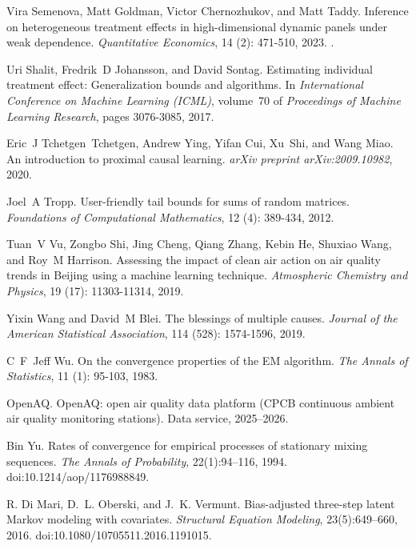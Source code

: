 Vira Semenova, Matt Goldman, Victor Chernozhukov, and Matt Taddy.
\newblock Inference on heterogeneous treatment effects in high-dimensional dynamic panels under weak dependence.
\newblock \emph{Quantitative Economics}, 14 (2): 471-510, 2023.
\newblock {}.

Uri Shalit, Fredrik~D Johansson, and David Sontag.
\newblock Estimating individual treatment effect: Generalization bounds and algorithms.
\newblock In \emph{International Conference on Machine Learning (ICML)}, volume~70 of \emph{Proceedings of Machine Learning Research}, pages 3076-3085, 2017.

Eric~J Tchetgen~Tchetgen, Andrew Ying, Yifan Cui, Xu~Shi, and Wang Miao.
\newblock An introduction to proximal causal learning.
\newblock \emph{arXiv preprint arXiv:2009.10982}, 2020.

Joel~A Tropp.
\newblock User-friendly tail bounds for sums of random matrices.
\newblock \emph{Foundations of Computational Mathematics}, 12 (4): 389-434, 2012.

Tuan~V Vu, Zongbo Shi, Jing Cheng, Qiang Zhang, Kebin He, Shuxiao Wang, and Roy~M Harrison.
\newblock Assessing the impact of clean air action on air quality trends in {B}eijing using a machine learning technique.
\newblock \emph{Atmospheric Chemistry and Physics}, 19 (17): 11303-11314, 2019.

Yixin Wang and David~M Blei.
\newblock The blessings of multiple causes.
\newblock \emph{Journal of the American Statistical Association}, 114 (528): 1574-1596, 2019.

C~F~Jeff Wu.
\newblock On the convergence properties of the {EM} algorithm.
\newblock \emph{The Annals of Statistics}, 11 (1): 95-103, 1983.

OpenAQ.
\newblock OpenAQ: open air quality data platform (CPCB continuous ambient air quality monitoring stations).
\newblock Data service, 2025--2026.

Bin Yu.
\newblock Rates of convergence for empirical processes of stationary mixing sequences.
\newblock \emph{The Annals of Probability}, 22(1):94--116, 1994.
\newblock doi:10.1214/aop/1176988849.


R. Di Mari, D.~L. Oberski, and J.~K. Vermunt.
\newblock Bias-adjusted three-step latent Markov modeling with covariates.
\newblock \emph{Structural Equation Modeling}, 23(5):649--660, 2016.
\newblock doi:10.1080/10705511.2016.1191015.
